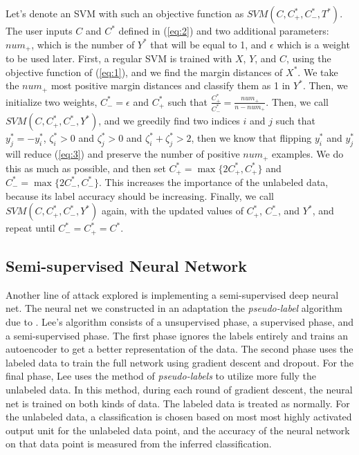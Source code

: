 \documentclass[11pt]{article}
\begin{document}
Let's denote an SVM with such an objective function as $SVM(C,C^*_+,C^*_-,T^*)$.
The user inputs $C$ and $C^*$ defined in (\ref{eq:2}) and two additional parameters: $num_+$, which is the number of $Y^*$ that will be equal to 1, and $\epsilon$ which is a weight to be used later. First, a regular SVM is trained with $X$, $Y$, and $C$, using the objective function of (\ref{eq:1}), and we find the margin distances of $X^*$. We take the $num_+$ most positive margin distances and classify them as 1 in $Y^*$. Then, we initialize two weights, $C^*_- = \epsilon$ and $C^*_+$ such that $\frac{C^*_+}{C^*_-} = \frac{num_+}{n-num_+}$. Then, we call $SVM(C,C^*_+,C^*_-,Y^*)$, and we greedily find two indices $i$ and $j$ such that $y^*_j = -y^*_i$, $\zeta^*_i > 0$ and $\zeta^*_j > 0$ and $\zeta^*_i+\zeta^*_j > 2$, then we know that flipping $y^*_i$ and $y^*_j$ will reduce (\ref{eq:3}) and preserve the number of positive $num_+$ examples. We do this as much as possible, and then set $C^*_+ = \max\{2C^*_+, C^*_+\}$ and $C^*_- = \max\{2C^*_-, C^*_-\}$. This increases the importance of the unlabeled data, because its label accuracy should be increasing. Finally, we call $SVM(C,C^*_+,C^*_-,Y^*)$ again, with the updated values of $C^*_+$, $C^*_-$, and $Y^*$, and repeat until $C^*_- = C^*_+ = C^*$.

\subsection{Semi-supervised Neural Network}

Another line of attack explored is implementing a semi-supervised deep neural net. The neural net we constructed in an adaptation the \emph{pseudo-label} algorithm due to \cite{Lee:2013}. Lee's algorithm consists of a unsupervised phase, a supervised phase, and a semi-supervised phase. The first phase ignores the labels entirely and trains an autoencoder to get a better representation of the data. The second phase uses the labeled data to train the full network using gradient descent and dropout. For the final phase, Lee uses the method of \emph{pseudo-labels} to utilize more fully the unlabeled data. In this method, during each round of gradient descent, the neural net is trained on both kinds of data. The labeled data is treated as normally. For the unlabeled data, a classification is chosen based on most most highly activated output unit for the unlabeled data point, and the accuracy of the neural network on that data point is measured from the inferred classification.
\end{document}
